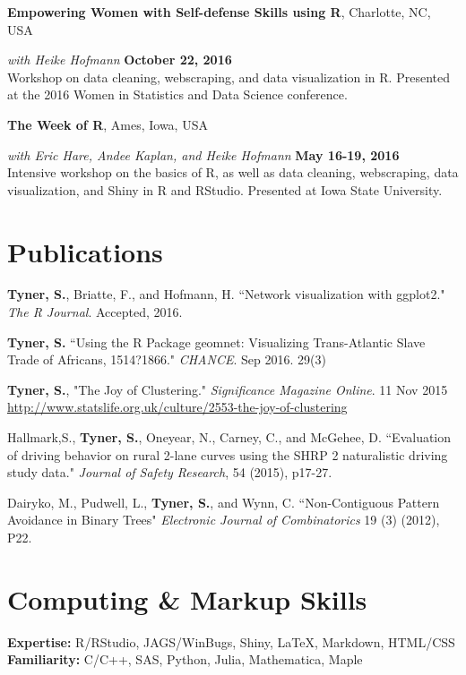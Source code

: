 \documentclass[margin,line]{res}
\begin{document}
\begin{resume}
{\bf Empowering Women with Self-defense Skills using R}, Charlotte, NC, USA

\vspace{-.3cm}

{\em with Heike Hofmann} \hfill {\bf October 22, 2016}\\
Workshop on data cleaning, webscraping, and data visualization in R. Presented at the 2016 Women in Statistics and Data Science conference.

{\bf The Week of R}, Ames, Iowa, USA

\vspace{-.3cm}

{\em with Eric Hare, Andee Kaplan, and Heike Hofmann} \hfill {\bf May 16-19, 2016}\\
Intensive workshop on the basics of R, as well as data cleaning, webscraping, data visualization, and Shiny in R and RStudio. Presented at Iowa State University.
 
\section{\sc Publications}

\textbf{Tyner, S.}, Briatte, F., and Hofmann, H. ``Network visualization with ggplot2." \textit{The R Journal}. Accepted, 2016.

\textbf{Tyner, S.} ``Using the R Package geomnet: Visualizing Trans-Atlantic Slave Trade of Africans, 1514?1866." \textit{CHANCE}.  Sep 2016. 29(3)

\textbf{Tyner, S.}, "The Joy of Clustering." \textit{Significance Magazine Online}. 11 Nov 2015 \url{http://www.statslife.org.uk/culture/2553-the-joy-of-clustering}

Hallmark,S., \textbf{Tyner, S.},  Oneyear, N., Carney, C., and McGehee, D. ``Evaluation of driving behavior on rural 2-lane curves using the SHRP 2 naturalistic driving study data." \textit{Journal of Safety Research}, 54 (2015), p17-27.

Dairyko, M., Pudwell, L., \textbf{Tyner, S.}, and Wynn, C.  ``Non-Contiguous Pattern Avoidance in Binary Trees" \textit{Electronic Journal of Combinatorics} 19 (3) (2012), P22.

\section{\sc Computing \& Markup Skills} 

\textbf{Expertise:} R/RStudio, JAGS/WinBugs, Shiny, \LaTeX, Markdown,  HTML/CSS\\
\textbf{Familiarity:}  C/C++, SAS, Python, Julia, Mathematica, Maple



\end{resume}
\end{document}

